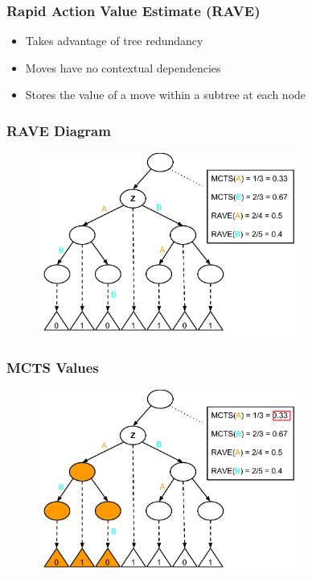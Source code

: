 \documentclass{beamer}
\begin{document}
\begin{frame}
\frametitle{Rapid Action Value Estimate (RAVE)}
\begin{itemize}
	\item Takes advantage of tree redundancy
	\item Moves have no contextual dependencies
	\item Stores the value of a move within a subtree at each node
\end{itemize}
\end{frame}


\begin{frame}[fragile]
\frametitle{RAVE Diagram}
\begin{figure}[h]
	\includegraphics[width=8.5cm]{Diagrams/Rave/RAVEDiagram.pdf}
	\centering
\end{figure}
\end{frame}

\begin{frame}[fragile]
\frametitle{MCTS Values}
\begin{figure}[h]
	\includegraphics[width=8.5cm]{Diagrams/Rave/MCTSValueA.pdf}
	\centering
\end{figure}
\end{frame}
\end{document}
